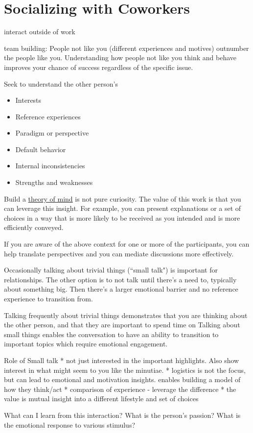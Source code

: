 \section{Socializing with Coworkers\label{sec:socializing}}

interact outside of work

team building:
People not like you (different experiences and motives) outnumber the people like you.
Understanding how people not like you think and behave improves your chance of success regardless of the specific issue.

Seek to understand the other person's
\begin{itemize}
\item Interests
\item Reference experiences
\item Paradigm or perspective
\item Default behavior
\item Internal inconsistencies
\item Strengths and weaknesses
\end{itemize}

Build a \href{https://en.wikipedia.org/wiki/Theory_of_mind}{theory of mind} is not pure curiosity. The value of this work is that you can leverage this insight. For example, you can present explanations or a set of choices in a way that is more likely to be received as you intended and is more efficiently conveyed.  

If you are aware of the above context for one or more of the participants, you can help translate perspectives and you can mediate discussions more effectively. 

Occasionally talking about trivial things (``small talk") is important for relationships.
The other option is to not talk until there's a need to, typically about something big. Then there's a larger emotional barrier and no reference experience to transition from.

Talking frequently about trivial things demonstrates that you are thinking about the other person, and that they are important to spend time on
Talking about small things enables the conversation to have an ability to transition to important topics which require emotional engagement.

Role of Small talk
* not just interested in the important highlights. Also show interest in what might seem to you like the minutiae. 
* logistics is not the focus, but can lead to emotional and motivation insights. enables building a model of how they think/act
* comparison of experience - leverage the difference
* the value is mutual insight into a different lifestyle and set of choices

What can I learn from this interaction?
What is the person's passion?
What is the emotional response to various stimulus?


